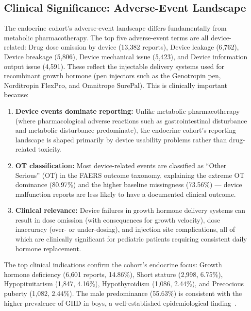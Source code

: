 \documentclass[10pt,twocolumn]{article}
\begin{document}
\subsection{Clinical Significance: Adverse-Event Landscape}
 
The endocrine cohort's adverse-event landscape differs fundamentally from metabolic pharmacotherapy. The top five adverse-event terms are all device-related: Drug dose omission by device (13{,}382 reports), Device leakage (6{,}762), Device breakage (5{,}806), Device mechanical issue (5{,}423), and Device information output issue (4{,}591). These reflect the injectable delivery systems used for recombinant growth hormone (pen injectors such as the Genotropin pen, Norditropin FlexPro, and Omnitrope SurePal). This is clinically important because:
 
\begin{enumerate}[leftmargin=*]
\item \textbf{Device events dominate reporting:} Unlike metabolic pharmacotherapy (where pharmacological adverse reactions such as gastrointestinal disturbance and metabolic disturbance predominate), the endocrine cohort's reporting landscape is shaped primarily by device usability problems rather than drug-related toxicity.
\item \textbf{OT classification:} Most device-related events are classified as ``Other Serious'' (OT) in the FAERS outcome taxonomy, explaining the extreme OT dominance (80.97\%) and the higher baseline missingness (73.56\%) --- device malfunction reports are less likely to have a documented clinical outcome.
\item \textbf{Clinical relevance:} Device failures in growth hormone delivery systems can result in dose omission (with consequences for growth velocity), dose inaccuracy (over- or under-dosing), and injection site complications, all of which are clinically significant for pediatric patients requiring consistent daily hormone replacement.
\end{enumerate}
 
The top clinical indications confirm the cohort's endocrine focus: Growth hormone deficiency (6{,}601 reports, 14.86\%), Short stature (2{,}998, 6.75\%), Hypopituitarism (1{,}847, 4.16\%), Hypothyroidism (1{,}086, 2.44\%), and Precocious puberty (1{,}082, 2.44\%). The male predominance (55.63\%) is consistent with the higher prevalence of GHD in boys, a well-established epidemiological finding~\cite{grimberg2016}.
 
\end{document}
